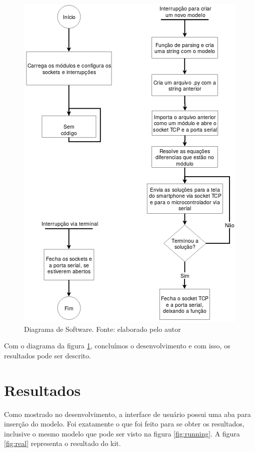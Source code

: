 \documentclass[journal]{IEEEtranTIE}
\begin{document}
\begin{figure}[!h]
	\includegraphics[width=\linewidth]{img/software.png}
    \caption{Diagrama de Software. Fonte: elaborado pelo autor}
    \label{fig:software}
\end{figure}

Com o diagrama da figura \ref{fig:software}, concluímos o desenvolvimento e com isso, os resultados pode ser descrito.


\section{Resultados}

Como mostrado no desenvolvimento, a interface de usuário possui uma aba para inserção do modelo. Foi exatamente o que foi feito para se obter os resultados, inclusive o mesmo modelo que pode ser visto na figura \ref{fig:running}. A figura \ref{fig:real} representa o resultado do kit.
\end{document}
